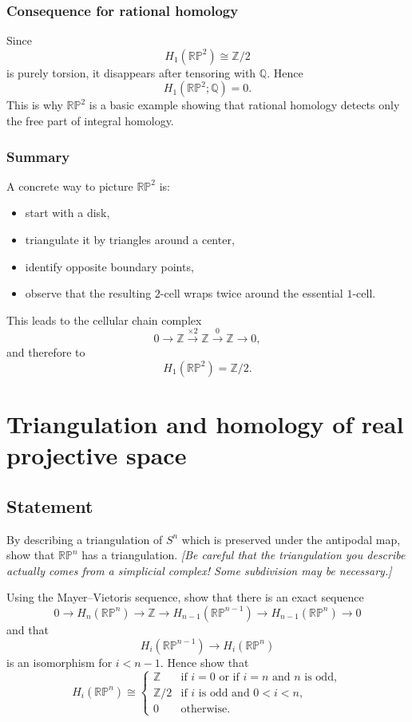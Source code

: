 \documentclass[12pt,a4paper]{article}
\theoremstyle{notespace}
\begin{document}
\subsubsection*{Consequence for rational homology}

Since
\[
H_1(\mathbb{RP}^2)\cong \mathbb Z/2
\]
is purely torsion, it disappears after tensoring with \(\mathbb Q\). Hence
\[
H_1(\mathbb{RP}^2;\mathbb Q)=0.
\]
This is why \(\mathbb{RP}^2\) is a basic example showing that rational homology detects only the free part of integral homology.

\subsubsection*{Summary}

A concrete way to picture \(\mathbb{RP}^2\) is:

\begin{itemize}
	\item start with a disk,
	\item triangulate it by triangles around a center,
	\item identify opposite boundary points,
	\item observe that the resulting \(2\)-cell wraps twice around the essential \(1\)-cell.
\end{itemize}

This leads to the cellular chain complex
\[
0\longrightarrow \mathbb Z
\xrightarrow{\times 2}
\mathbb Z
\xrightarrow{0}
\mathbb Z
\longrightarrow 0,
\]
and therefore to
\[
\boxed{H_1(\mathbb{RP}^2)=\mathbb Z/2.}
\]

\section{Triangulation and homology of real projective space}

\subsection*{Statement}
By describing a triangulation of \(S^n\) which is preserved under the antipodal map, show that \(\mathbb{RP}^n\) has a triangulation. \emph{[Be careful that the triangulation you describe actually comes from a simplicial complex! Some subdivision may be necessary.]}

Using the Mayer--Vietoris sequence, show that there is an exact sequence
\[
0 \longrightarrow H_n(\mathbb{RP}^n) \longrightarrow \mathbb Z \longrightarrow H_{n-1}(\mathbb{RP}^{n-1}) \longrightarrow H_{n-1}(\mathbb{RP}^n) \longrightarrow 0
\]
and that
\[
H_i(\mathbb{RP}^{n-1})\longrightarrow H_i(\mathbb{RP}^n)
\]
is an isomorphism for \(i<n-1\). Hence show that
\[
H_i(\mathbb{RP}^n)\cong
\begin{cases}
	\mathbb Z & \text{if } i=0 \text{ or if } i=n \text{ and } n \text{ is odd},\\[4pt]
	\mathbb Z/2 & \text{if } i \text{ is odd and } 0<i<n,\\[4pt]
	0 & \text{otherwise.}
\end{cases}
\]
\end{document}
